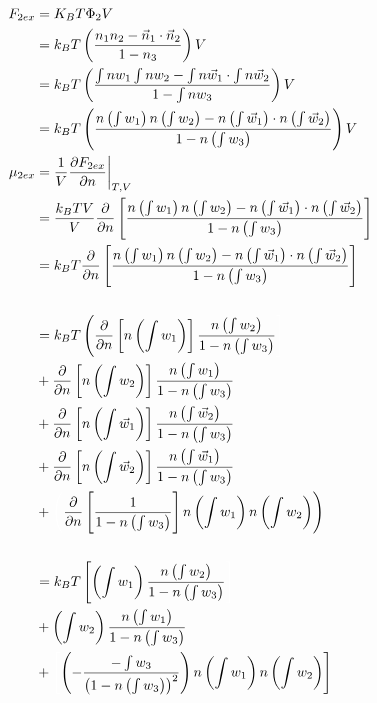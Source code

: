 \documentclass[double,12pt]{revtex4-2}
\begin{document}
\begin{align}
    F_{2ex} &= K_BT\Phi_2 V\\
            &= k_BT\left(\frac{n_1n_2-\vec n_1\cdot\vec n_2}{1-n_3}\right)V  \\
            &= k_BT\left(\frac{\int nw_1\int nw_2-\int n\vec w_1\cdot \int n \vec w_2}{1-\int nw_3}\right)V  \\
            &= k_BT\left(\frac{n\left(\int w_1\right) n\left(\int w_2\right)- n\left(\int \vec w_1\right)\cdot n\left(\int \vec w_2\right)}{1-n\left(\int w_3\right)}\right)V  \\
  \mu_{2ex} &= \frac{1}{V}\frac{\partial F_{2ex}}{\partial n} \bigg|_{T,V}\\
            &= \frac{k_BTV}{V} \frac{\partial}{\partial n}\left[\frac{n\left(\int w_1\right) n\left(\int w_2\right)- n\left(\int \vec w_1\right)\cdot n\left(\int \vec w_2\right)}{1-n\left(\int w_3\right)}\right] \\ 
            &= k_BT \frac{\partial}{\partial n}\left[\frac{n\left(\int w_1\right) n\left(\int w_2\right)- n\left(\int \vec w_1\right)\cdot n\left(\int \vec w_2\right)}{1-n\left(\int w_3\right)}\right] \\ \\          
%            
            &= k_BT \left(\frac{\partial}{\partial n}\left[n\left(\int w_1\right)\right]\frac{n\left(\int w_2\right)}{1-n\left(\int w_3\right)} \color{white}\right]\color{black} \\
            &+ \frac{\partial}{\partial n}\left[n\left(\int w_2\right)\right]\frac{n\left(\int w_1\right)}{1-n\left(\int w_3\right)} \\           
            &+ \frac{\partial}{\partial n}\left[n\left(\int \vec w_1\right)\right]\frac{n\left(\int \vec w_2\right)}{1-n\left(\int w_3\right)} \\ %
            &+ \frac{\partial}{\partial n}\left[n\left(\int \vec w_2\right)\right]\frac{n\left(\int \vec w_1\right)}{1-n\left(\int w_3\right)} \\           
            &+ \color{white}\left(\color{black}\frac{\partial}{\partial n}\left[\frac{1}{1-n\left(\int w_3\right)}\right]n\left(\int w_1\right)n\left(\int w_2\right) \right)\\ \\
%            
            &= k_BT \left[\left(\int w_1\right)\frac{n\left(\int w_2\right)}{1-n\left(\int w_3\right)} \color{white}\right]\color{black} \\
            &+ \left(\int w_2\right)\frac{n\left(\int w_1\right)}{1-n\left(\int w_3\right)} \\
            &+ \color{white}\left[\color{black}\left(-\frac{-\int w_3}{\left(1-n\left(\int w_3\right)\right)^2}\right)n\left(\int w_1\right)n\left(\int w_2\right)\right]
\end{align} 
\end{document}
